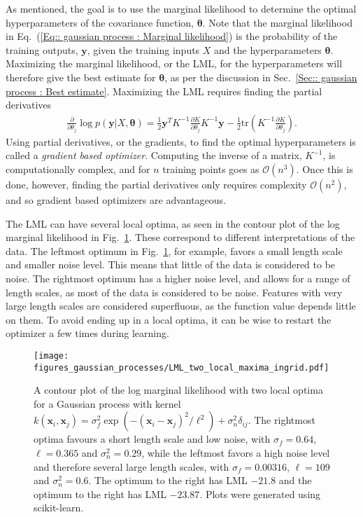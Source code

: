 \documentclass[twoside,english]{uiofysmaster}
\begin{document}
{As mentioned, the goal is to use the marginal likelihood to determine the optimal hyperparameters of the covariance function, $\boldsymbol{\theta}$. Note that the marginal likelihood in Eq.~(\ref{Eq:: gaussian process : Marginal likelihood}) is the probability of the training outputs, $\textbf{y}$, given the training inputs $X$ and the hyperparameters $\boldsymbol{\theta}$. Maximizing the marginal likelihood, or the LML, for the hyperparameters will therefore give the best estimate for $\boldsymbol{\theta}$, as per the discussion in Sec.~\ref{Sec:: gaussian process : Best estimate}. Maximizing the LML requires finding the partial derivatives 
\begin{align}
\frac{\partial}{\partial \theta_j}
 \log p(\textbf{y}|X, \boldsymbol{\theta}) = \frac{1}{2} \textbf{y}^T K^{-1} \frac{\partial K}{\partial \theta_j} K^{-1} \textbf{y} - \frac{1}{2} \text{tr} (K^{-1} \frac{\partial K}{\partial \theta_j}).
\end{align}
Using partial derivatives, or the gradients, to find the optimal hyperparameters is called a \textit{gradient based optimizer}. Computing the inverse of a matrix, $K^{-1}$, is computationally complex, and for $n$ training points goes as $\mathcal{O}(n^3)$. Once this is done, however, finding the partial derivatives only requires complexity $\mathcal{O}(n^2)$, and so gradient based optimizers are advantageous.

The LML can have several local optima, as seen in the contour plot of the log marginal likelihood in Fig.~\ref{Fig:: gaussian process : LML several local optima}. These correspond to different interpretations of the data. The leftmost optimum in Fig.~\ref{Fig:: gaussian process : LML several local optima}, for example, favors a small length scale and smaller noise level. This means that little of the data is considered to be noise. The rightmost optimum has a higher noise level, and allows for a range of length scales, as most of the data is considered to be noise. Features with very large length scales are considered superfluous, as the function value depends little on them. To avoid ending up in a local optima, it can be wise to restart the optimizer a few times during learning.

\begin{figure}
\centering
\texttt{[image: figures\_gaussian\_processes/LML\_two\_local\_maxima\_ingrid.pdf]}
\caption{A contour plot of the log marginal likelihood with two local optima for a Gaussian process with kernel $k(\textbf{x}_i, \textbf{x}_j) = \sigma_f^2 \exp(- (\textbf{x}_i - \textbf{x}_j)^2 / \ell^2) + \sigma_n^2 \delta_{ij}$. The rightmost optima favours a short length scale and low noise, with $\sigma_f = 0.64$, $\ell = 0.365$ and $\sigma^2_n = 0.29$, while the leftmost favors a high noise level and therefore several large length scales, with $\sigma_f = 0.00316$, $\ell = 109$ and $\sigma^2_n = 0.6$. The optimum to the right has LML $-21.8$ and the optimum to the right has LML $-23.87$. Plots were generated using scikit-learn.}
\label{Fig:: gaussian process : LML several local optima}
\end{figure}


}
\end{document}
